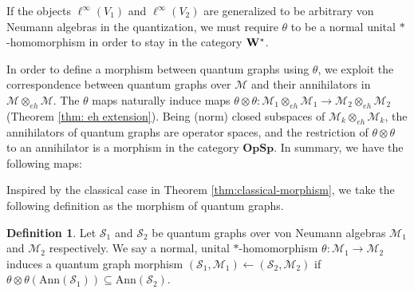 \documentclass[12pt]{article}
\theoremstyle{definition}
\newtheorem{definition}[theorem]{Definition}
\newcommand{\mc}[1]{\mathcal{#1}}
\newcommand{\<}{\langle}
\renewcommand{\>}{\rangle}
\newcommand{\Ann}{\text{Ann}}
\begin{document}
If the objects $\ell^\infty(V_1)$ and $\ell^\infty(V_2)$ are generalized to be arbitrary von Neumann algebras in the quantization, we must require $\theta$ to be a normal unital $*$-homomorphism in order to stay in the category $\bf W^*$. 

\begin{center}
\end{center}

In order to define a morphism between quantum graphs using $\theta$, we exploit the correspondence between quantum graphs over $\mc M$ and their annihilators in $\mc M \otimes_{eh} \mc M$. The $\theta$ maps naturally induce maps $\theta \otimes \theta: \mc M_1 \otimes_{eh} \mc M_1 \to \mc M_2 \otimes_{eh} \mc M_2$ (Theorem \ref{thm: eh extension}). %
Being (norm) closed subspaces of $\mc M_k \otimes_{eh} \mc M_k$, the annihilators of quantum graphs are operator spaces, and the restriction of $\theta \otimes \theta$ to an annihilator is a morphism in the category $\mathbf{OpSp}$. In summary, we have the following maps:

\begin{center}
\end{center}

Inspired by the classical case in Theorem \ref{thm:classical-morphism}, we take the following definition as the morphism of quantum graphs.
\begin{definition} \label{defn: qgraph morph}
    Let $\mc S_1$ and $\mc S_2$ be quantum graphs over von Neumann algebras $\mc M_1$ and $\mc M_2$ respectively. We say a normal, unital $*$-homomorphism $\theta: \mc M_1 \to \mc M_2$ induces a quantum graph morphism $(\mc S_1, \mc M_1) \leftarrow (\mc S_2, \mc M_2)$ if $\theta \otimes \theta(\Ann(\mc S_1)) \subseteq \Ann(\mc S_2)$.
\end{definition}
\end{document}
